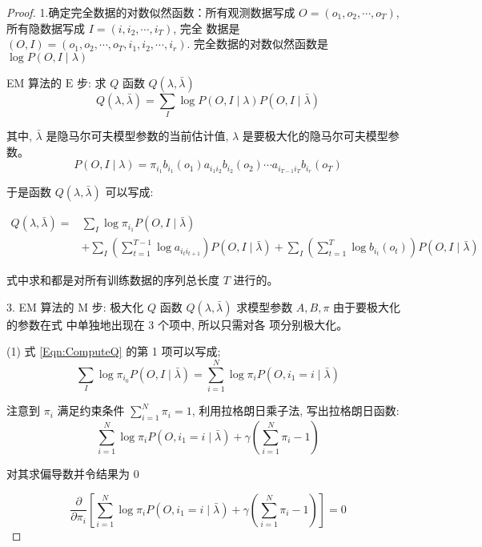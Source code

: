 \begin{proof}
    1.确定完全数据的对数似然函数：所有观测数据写成 $ O=\left(o_{1}, o_{2}, \cdots, o_{T}\right) $, 所有隐数据写成 $ I=\left(i, i_{2}, \cdots, i_{T}\right) $, 完全 数据是 $ (O, I)=\left(o_{1}, o_{2}, \cdots, o_{T}, i_{1}, i_{2}, \cdots, i_{r}\right) . $ 完全数据的对数似然函数是 $ \log P(O, I \mid \lambda) $


EM 算法的 $ \mathrm{E} $ 步: 求 $ Q $ 函数 $ Q(\lambda, \bar{\lambda}) $
$$
Q(\lambda, \bar{\lambda})=\sum_{I} \log P(O, I \mid \lambda) P(O, I \mid \bar{\lambda})
$$

其中, $ \bar{\lambda} $ 是隐马尔可夫模型参数的当前估计值, $ \lambda $ 是要极大化的隐马尔可夫模型参数。
$$ P(O, I \mid \lambda)=\pi_{i_{1}} b_{i_{1}}\left(o_{1}\right) a_{i_1 i_{2}} b_{i_{2}}\left(o_{2}\right) \cdots a_{i_{T-1} i_{T}} b_{i_{r}}\left(o_{T}\right) $$

于是函数 $ Q(\lambda, \bar{\lambda}) $ 可以写成:

\begin{equation}
    \label{Eqn:ComputeQ}
\begin{aligned}
Q(\lambda, \bar{\lambda})=& \sum_{I} \log \pi_{i_1} P(O, I \mid \bar{\lambda}) \\
&+\sum_{I}\left(\sum_{t=1}^{T-1} \log a_{i_t i_{t+1}}\right) P(O, I \mid \bar{\lambda})+\sum_{I}\left(\sum_{t=1}^{T} \log b_{i_{t}}\left(o_{t}\right)\right) P(O, I \mid \bar{\lambda})
\end{aligned}
\end{equation}


式中求和都是对所有训练数据的序列总长度 $ T $ 进行的。


3. EM 算法的 $ \mathrm{M} $ 步: 极大化 $ Q $ 函数 $ Q(\lambda, \bar{\lambda}) $ 求模型参数 $ A, B, \pi $ 由于要极大化的参数在式 中单独地出现在 3 个项中, 所以只需对各 项分别极大化。

(1) 式 \ref{Eqn:ComputeQ} 的第 1 项可以写成;
$$
\sum_{I} \log \pi_{i_{0}} P(O, I \mid \bar{\lambda})=\sum_{i=1}^{N} \log \pi_{i} P\left(O, i_{1}=i \mid \bar{\lambda}\right)
$$

注意到 $ \pi_{i} $ 满足约束条件 $ \sum_{i=1}^{N} \pi_{i}=1 $, 利用拉格朗日乘子法, 写出拉格朗日函数:
$$
\sum_{i=1}^{N} \log \pi_{i} P\left(O, i_{1}=i \mid \bar{\lambda}\right)+\gamma\left(\sum_{i=1}^{N} \pi_{i}-1\right)
$$

对其求偏导数并令结果为 0


\begin{equation}
    \label{Eqn:PartialDerivativeOfLagrange}
    \frac{\partial}{\partial \pi_{i}}\left[\sum_{i=1}^{N} \log \pi_{i} P\left(O, i_{1}=i \mid \bar{\lambda}\right)+\gamma\left(\sum_{i=1}^{N} \pi_{i}-1\right)\right]=0
\end{equation}



\end{proof}
